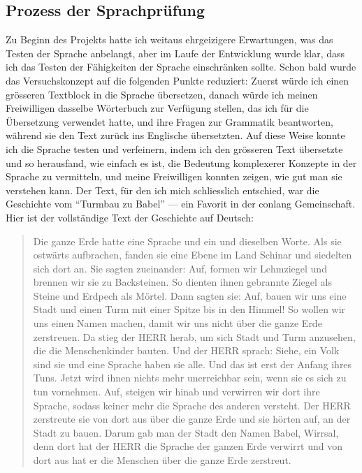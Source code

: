 \documentclass{article}
\begin{document}
\subsection{Prozess der Sprachprüfung}
Zu Beginn des Projekts hatte ich weitaus ehrgeizigere Erwartungen, was das Testen der Sprache anbelangt,
aber im Laufe der Entwicklung wurde klar, dass ich das Testen der Fähigkeiten der Sprache einschränken sollte.
Schon bald wurde das Versuchskonzept auf die folgenden Punkte reduziert: Zuerst würde ich einen grösseren Textblock in die
Sprache übersetzen, danach würde ich meinen Freiwilligen dasselbe Wörterbuch zur Verfügung stellen, das ich für die Übersetzung
verwendet hatte, und ihre Fragen zur Grammatik beantworten, während sie den Text zurück ins Englische übersetzten.
Auf diese Weise konnte ich die Sprache testen und verfeinern, indem ich den grösseren Text übersetzte und so herausfand,
wie einfach es ist, die Bedeutung komplexerer Konzepte in der Sprache zu vermitteln, und meine Freiwilligen konnten zeigen,
wie gut man sie verstehen kann. Der Text, für den ich mich schliesslich entschied, war die Geschichte vom ``Turmbau zu Babel''
--- ein Favorit in der conlang Gemeinschaft. Hier ist der vollständige Text der Geschichte auf Deutsch:

\begin{quotation}
    Die ganze Erde hatte eine Sprache und ein und dieselben Worte.
    Als sie ostwärts aufbrachen, fanden sie eine Ebene im Land Schinar und siedelten sich dort an.
    Sie sagten zueinander: Auf, formen wir Lehmziegel und brennen wir sie zu Backsteinen.
    So dienten ihnen gebrannte Ziegel als Steine und Erdpech als Mörtel.
    Dann sagten sie: Auf, bauen wir uns eine Stadt und einen Turm mit einer Spitze bis in den Himmel!
    So wollen wir uns einen Namen machen, damit wir uns nicht über die ganze Erde zerstreuen.
    Da stieg der HERR herab, um sich Stadt und Turm anzusehen, die die Menschenkinder bauten.
    Und der HERR sprach: Siehe, ein Volk sind sie und eine Sprache haben sie alle.
    Und das ist erst der Anfang ihres Tuns. Jetzt wird ihnen nichts mehr unerreichbar sein, wenn sie es sich zu tun vornehmen.
    Auf, steigen wir hinab und verwirren wir dort ihre Sprache, sodass keiner mehr die Sprache des anderen versteht.
    Der HERR zerstreute sie von dort aus über die ganze Erde und sie hörten auf, an der Stadt zu bauen.
    Darum gab man der Stadt den Namen Babel, Wirrsal, denn dort hat der HERR die Sprache der ganzen Erde
    verwirrt und von dort aus hat er die Menschen über die ganze Erde zerstreut.\citep{Bibel2020}
\end{quotation}
\end{document}
